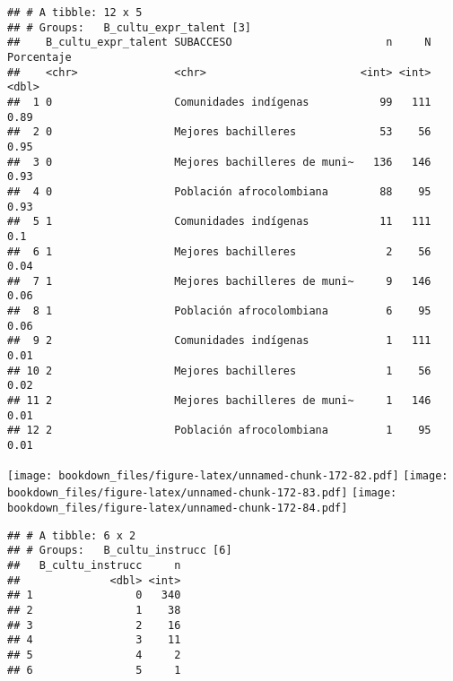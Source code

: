 \documentclass[]{article}
\theoremstyle{definition}
\theoremstyle{definition}
\theoremstyle{definition}
\theoremstyle{remark}
\begin{document}
\begin{verbatim}
## # A tibble: 12 x 5
## # Groups:   B_cultu_expr_talent [3]
##    B_cultu_expr_talent SUBACCESO                        n     N Porcentaje
##    <chr>               <chr>                        <int> <int>      <dbl>
##  1 0                   Comunidades indígenas           99   111       0.89
##  2 0                   Mejores bachilleres             53    56       0.95
##  3 0                   Mejores bachilleres de muni~   136   146       0.93
##  4 0                   Población afrocolombiana        88    95       0.93
##  5 1                   Comunidades indígenas           11   111       0.1 
##  6 1                   Mejores bachilleres              2    56       0.04
##  7 1                   Mejores bachilleres de muni~     9   146       0.06
##  8 1                   Población afrocolombiana         6    95       0.06
##  9 2                   Comunidades indígenas            1   111       0.01
## 10 2                   Mejores bachilleres              1    56       0.02
## 11 2                   Mejores bachilleres de muni~     1   146       0.01
## 12 2                   Población afrocolombiana         1    95       0.01
\end{verbatim}

\texttt{[image: bookdown\_files/figure-latex/unnamed-chunk-172-82.pdf]}
\texttt{[image: bookdown\_files/figure-latex/unnamed-chunk-172-83.pdf]}
\texttt{[image: bookdown\_files/figure-latex/unnamed-chunk-172-84.pdf]}

\begin{verbatim}
## # A tibble: 6 x 2
## # Groups:   B_cultu_instrucc [6]
##   B_cultu_instrucc     n
##              <dbl> <int>
## 1                0   340
## 2                1    38
## 3                2    16
## 4                3    11
## 5                4     2
## 6                5     1
\end{verbatim}
\end{document}
